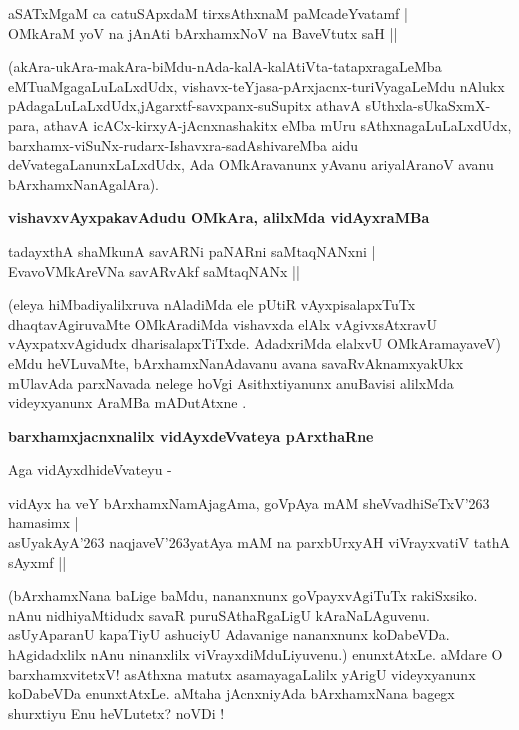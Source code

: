 \begin{shloka}
aSATxMgaM ca catuSApxdaM tirxsAthxnaM paMcadeYvatamf |\\\label{48}
OMkAraM yoV na jAnAti bArxhamxNoV na BaveVtutx saH ||
\end{shloka}

\noindent
(akAra-ukAra-makAra-biMdu-nAda-kalA-kalAtiVta-tatapxragaLeMba eMTu\break aMgagaLuLaLxdUdx, vi\-shavx-teYjasa-pArxjacnx-turiVyagaLeMdu nAlukx pAdagaLuLaLxdUdx,\break jAgarxtf-savxpanx-suSupitx athavA sUthxla-sU\-kaSxmX-\-para, athavA icACx-kirxyA-jAcnxna\-shakitx eMba mUru sAthxnagaLuLaLxdUdx, barxhamx-viSuNx-rudarx-Ishavxra-sa\-dA\-shiva\-reMba aidu deVvategaLanunxLaLxdUdx, Ada OMkAravanunx yAvanu ariyalAranoV avanu bArxhamxNa\-nAga\-lAra).

{\bigskip
\noindent
{\large\bf vishavxvAyxpakavAdudu OMkAra, alilxMda vidAyxraMBa}}
\medskip

\begin{shloka}
tadayxthA shaMkunA savARNi paNARni saMtaqNANxni |\\\label{84}
EvavoVMkAreVNa savARvAkf saMtaqNANx ||
\end{shloka}

\noindent
(eleya hiMbadiyalilxruva nAladiMda ele pUtiR vAyxpisalapxTuTx dhaqtavAgiru\-vaMte OMkAradiMda vishavxda elAlx vAgivxsAtxravU vAyxpatxvAgidudx dharisalapxTiTxde. AdadxriMda elalxvU OMkAramayaveV) eMdu heVLu\-vaMte, bArxhamxNanAdavanu avana savaRvAknamxyakUkx mUlavAda parxNavada nelege hoVgi Asithxtiyanunx anuBavisi alilxMda videyxyanunx AraMBa mADu\-tAtxne .

{\bigskip
\noindent
{\large\bf barxhamxjacnxnalilx vidAyxdeVvateya pArxthaRne}}\label{page85}
\medskip

Aga vidAyxdhideVvateyu -

\begin{shloka}
vidAyx ha veY bArxhamxNamAjagAma, goVpAya mAM sheVvadhiSeTxV\char'263 hamasimx |\\\label{85}
asUyakAyA\char'263 naqjaveV\char'263yatAya mAM na parxbUrxyAH viVrayxvatiV tathA sAyxmf ||
\end{shloka}

\noindent
(bArxhamxNana baLige baMdu, nananxnunx goVpayxvAgiTuTx rakiSxsiko. nAnu nidhiyaMtidudx savaR puruSAthaR\-gaLigU kAraNaLAguvenu. asUyAparanU kapaTiyU ashuciyU Adavanige nananxnunx koDabeVDa. hAgidadxlilx nAnu ninanxlilx viVrayxdiMduLiyuvenu.) enunxtAtxLe. aMdare O barxhamxvitetxV!  asAthxna matutx asamayagaLalilx yArigU videyxyanunx koDabeVDa enunxtAtxLe. aMtaha jAcnxniyAda bArxhamxNana bagegx shurxtiyu Enu heVLutetx? noVDi !

